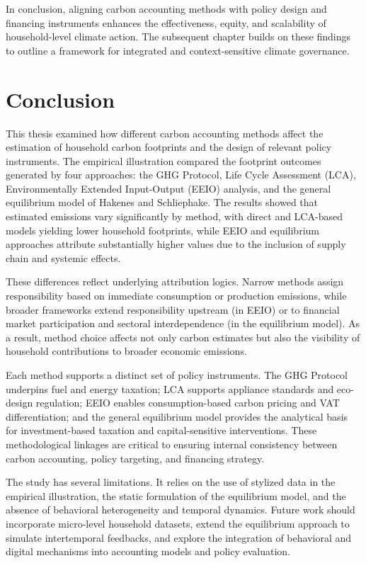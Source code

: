 \documentclass[12pt,a4paper]{article}%
\begin{document}
In conclusion, aligning carbon accounting methods with policy design and financing instruments enhances the effectiveness, equity, and scalability of household-level climate action. The subsequent chapter builds on these findings to outline a framework for integrated and context-sensitive climate governance.

\section{Conclusion}

This thesis examined how different carbon accounting methods affect the estimation of household carbon footprints and the design of relevant policy instruments. The empirical illustration compared the footprint outcomes generated by four approaches: the GHG Protocol, Life Cycle Assessment (LCA), Environmentally Extended Input-Output (EEIO) analysis, and the general equilibrium model of Hakenes and Schliephake. The results showed that estimated emissions vary significantly by method, with direct and LCA-based models yielding lower household footprints, while EEIO and equilibrium approaches attribute substantially higher values due to the inclusion of supply chain and systemic effects.

These differences reflect underlying attribution logics. Narrow methods assign responsibility based on immediate consumption or production emissions, while broader frameworks extend responsibility upstream (in EEIO) or to financial market participation and sectoral interdependence (in the equilibrium model). As a result, method choice affects not only carbon estimates but also the visibility of household contributions to broader economic emissions.

Each method supports a distinct set of policy instruments. The GHG Protocol underpins fuel and energy taxation; LCA supports appliance standards and eco-design regulation; EEIO enables consumption-based carbon pricing and VAT differentiation; and the general equilibrium model provides the analytical basis for investment-based taxation and capital-sensitive interventions. These methodological linkages are critical to ensuring internal consistency between carbon accounting, policy targeting, and financing strategy.


The study has several limitations. It relies on the use of stylized data in the empirical illustration, the static formulation of the equilibrium model, and the absence of behavioral heterogeneity and temporal dynamics. Future work should incorporate micro-level household datasets, extend the equilibrium approach to simulate intertemporal feedbacks, and explore the integration of behavioral and digital mechanisms into accounting models and policy evaluation.
\end{document}
